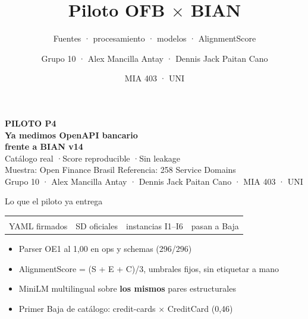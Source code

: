 \documentclass[aspectratio=169,12pt]{beamer}
\title{Piloto OFB $\times$ BIAN}
\subtitle{Fuentes · procesamiento · modelos · AlignmentScore}
\author[Grupo 10 · piloto OFB $\times$ BIAN · nov 2026]{Grupo 10 · Alex Mancilla Antay · Dennis Jack Paitan Cano}
\date{MIA 403 · UNI}
\begin{document}
\begin{frame}[plain]
  \vspace{0.95em}
  {\color{uniaccent}\large\bfseries PILOTO P4}\\[0.7em]
  {\Huge\bfseries\color{white} Ya medimos OpenAPI bancario}\\[0.15em]
  {\Huge\bfseries\color{white} frente a BIAN v14}\\[0.95em]
  {\large\color{white} Catálogo real \quad\textcolor{uniaccent}{·}\quad Score reproducible \quad\textcolor{uniaccent}{·}\quad Sin leakage}\\[1.15em]
  {\color{white!75} Muestra: Open Finance Brasil \qquad Referencia: 258 Service Domains}\\[0.3em]
  {\color{white!75} Grupo 10 · Alex Mancilla Antay · Dennis Jack Paitan Cano · MIA 403 · UNI}
\end{frame}

\begin{frame}[t]{Lo que el piloto ya entrega}
\vspace{0.25em}
\begin{tabularx}{\linewidth}{YYYY}
 &  &  & \\
\centering\color{black} YAML firmados & \centering\color{black} SD oficiales & \centering\color{black} instancias I1--I6 & \centering\arraybackslash\color{black} pasan a Baja\\
\end{tabularx}
\vspace{0.55em}
{\small
\begin{itemize}\itemsep0.42em
  \item Parser OE1 al 1,00 en ops y schemas (296/296)
  \item AlignmentScore = (S + E + C)/3, umbrales fijos, sin etiquetar a mano
  \item MiniLM multilingual sobre \textbf{los mismos} pares estructurales
  \item Primer Baja de catálogo: credit-cards $\times$ CreditCard (0,46)
\end{itemize}}
\end{frame}
\end{document}
